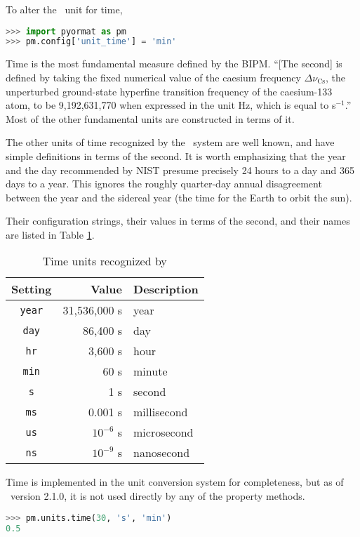 To alter the \PM\ unit for time,
\begin{lstlisting}[language=Python]
>>> import pyormat as pm
>>> pm.config['unit_time'] = 'min'
\end{lstlisting}

Time is the most fundamental measure defined by the BIPM.  ``[The second] is defined by taking the fixed numerical value of the caesium frequency $\Delta \nu_\mathrm{Cs}$, the unperturbed ground-state hyperfine transition frequency of the caesium-133 atom, to be 9,192,631,770 when expressed in the unit Hz, which is equal to s$^{-1}$.''\cite[p.130]{si:2019}  Most of the other fundamental units are constructed in terms of it.

The other units of time recognized by the \PM\ system are well known, and have simple definitions in terms of the second.  It is worth emphasizing that the year and the day recommended by NIST \cite{nist:sp811} presume precisely 24 hours to a day and 365 days to a year.  This ignores the roughly quarter-day annual disagreement between the year and the sidereal year (the time for the Earth to orbit the sun).

Their configuration strings, their values in terms of the second, and their names are listed in Table \ref{tab:time}.

\begin{table}
\centering
\caption{Time units recognized by \PM}\label{tab:time}
\begin{tabular}{crl}
\hline
Setting & Value & Description\\
\hline
\verb|year| & 31,536,000 s & year\\
\verb|day| & 86,400 s & day\\
\verb|hr| & 3,600 s & hour\\
\verb|min| & 60 s & minute\\
\verb|s| & 1 s & second\\
\verb|ms| & 0.001 s & millisecond\\
\verb|us| & $10^{-6}$ s & microsecond\\
\verb|ns| & $10^{-9}$ s & nanosecond\\
\hline
\end{tabular}
\end{table}

Time is implemented in the unit conversion system for completeness, but as of \PM\ version 2.1.0, it is not used directly by any of the property methods.

\begin{lstlisting}[language=Python, caption=Time Conversion Example]
>>> pm.units.time(30, 's', 'min')
0.5
\end{lstlisting}

